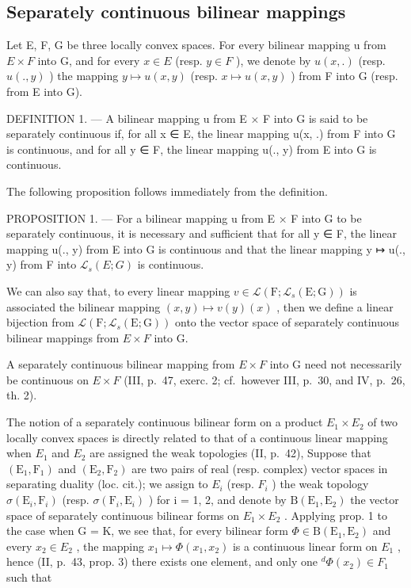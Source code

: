 \subsection{Separately continuous bilinear mappings}

Let E, F, G be three locally convex spaces. For every bilinear mapping u from \(E \times F\) into G, and for every \(x \in E\) (resp. \(y \in F\) ), we denote by \(u(x, .)\) (resp. \(u(., y)\) ) the mapping \(y \mapsto u(x, y)\) (resp. \(x \mapsto u(x, y)\) ) from F into G (resp. from E into G).

DEFINITION 1. --- A bilinear mapping u from E × F into G is said to be separately continuous if, for all x ∈ E, the linear mapping u(x, .) from F into G is continuous, and for all y ∈ F, the linear mapping u(., y) from E into G is continuous.

The following proposition follows immediately from the definition.

PROPOSITION 1. --- For a bilinear mapping u from E × F into G to be separately continuous, it is necessary and sufficient that for all y ∈ F, the linear mapping u(., y) from E into G is continuous and that the linear mapping y ↦ u(., y) from F into \(\mathcal{L}_s(E; G)\) is continuous.

We can also say that, to every linear mapping \(v \in \mathcal{L}\left(\mathrm{F}; \mathcal{L}_{s}(\mathrm{E}; \mathrm{G})\right)\) is associated the bilinear mapping \((x, y) \mapsto v(y)(x)\) , then we define a linear bijection from \(\mathcal{L}(\mathrm{F}; \mathcal{L}_{s}(\mathrm{E}; \mathrm{G}))\) onto the vector space of separately continuous bilinear mappings from \(E \times F\) into G.

A separately continuous bilinear mapping from \(E \times F\) into G need not necessarily be continuous on \(E \times F\) (III, p.~47, exerc. 2; cf.~however III, p.~30, and IV, p.~26, th. 2).

The notion of a separately continuous bilinear form on a product \(E_{1} \times E_{2}\) of two locally convex spaces is directly related to that of a continuous linear mapping when \(E_{1}\) and \(E_{2}\) are assigned the weak topologies (II, p.~42), Suppose that \((\mathrm{E}_{1}, \mathrm{F}_{1})\) and \((\mathrm{E}_{2}, \mathrm{F}_{2})\) are two pairs of real (resp. complex) vector spaces in separating duality (loc. cit.); we assign to \(E_{i}\) (resp. \(F_{i}\) ) the weak topology \(\sigma(\mathrm{E}_{i}, \mathrm{F}_{i})\) (resp. \(\sigma(\mathrm{F}_{i}, \mathrm{E}_{i})\) ) for i = 1, 2, and denote by \(\mathrm{B}(\mathrm{E}_{1}, \mathrm{E}_{2})\) the vector space of separately continuous bilinear forms on \(E_{1} \times E_{2}\) . Applying prop. 1 to the case when G = K, we see that, for every bilinear form \(\Phi \in \mathrm{B}(\mathrm{E}_{1}, \mathrm{E}_{2})\) and every \(x_{2} \in E_{2}\) , the mapping \(x_{1} \mapsto \Phi(x_{1}, x_{2})\) is a continuous linear form on \(E_{1}\) , hence (II, p.~43, prop. 3) there exists one element, and only one \(^{d}\Phi(x_{2}) \in F_{1}\) such that

